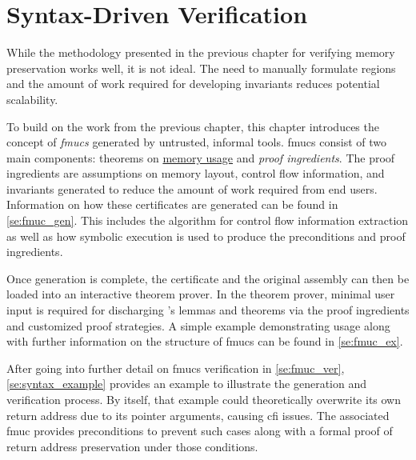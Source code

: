 \chapter{Syntax-Driven Verification}


While the methodology presented in the previous chapter
for verifying memory preservation works well, it is not ideal.%
The need to manually formulate regions
and the amount of work required for developing invariants%
reduces potential scalability.%

To build on the work from the previous chapter,
this chapter introduces the concept of \emph{\acp{fmuc}}
generated by untrusted, informal tools.
\Acp{fmuc} consist of two main components:
theorems on \hyperref[ch:memory]{memory usage} and \emph{proof ingredients}.%
%
The proof ingredients are assumptions on memory layout,
control flow information, and invariants
generated to reduce the amount of work required from end users.
Information on how these certificates are generated
can be found in \cref{se:fmuc_gen}.
This includes the algorithm for control flow information extraction
as well as how symbolic execution is used%
to produce the preconditions and proof ingredients.%


Once generation is complete, the certificate and the original assembly%
can then be loaded into an interactive theorem prover.
In the theorem prover,
minimal user input is required for discharging 's lemmas and theorems
via the proof ingredients and customized proof strategies.%
%
A simple example demonstrating usage along with 
further information on the structure of \acp{fmuc} can be found in \cref{se:fmuc_ex}.

After going into further detail on \acp{fmuc} verification in \cref{se:fmuc_ver},
\cref{se:syntax_example} provides an example to illustrate the generation
and verification process.
By itself, that example could theoretically overwrite its own return address
due to its pointer arguments, causing \ac{cfi} issues.
The associated \ac{fmuc} provides preconditions to prevent such cases%
along with a formal proof of return address preservation under those conditions.

